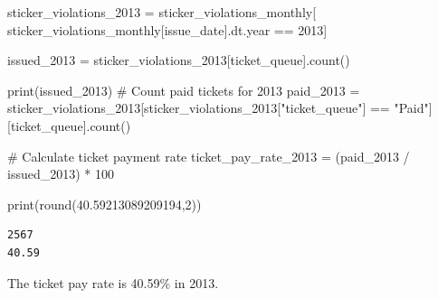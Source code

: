 \documentclass[
  letterpaper,
  DIV=11,
  numbers=noendperiod]{scrartcl}
\newenvironment{Shaded}{\begin{snugshade}}{\end{snugshade}}
\newcommand{\BuiltInTok}[1]{\textcolor[rgb]{0.00,0.23,0.31}{#1}}
\newcommand{\CommentTok}[1]{\textcolor[rgb]{0.37,0.37,0.37}{#1}}
\newcommand{\DecValTok}[1]{\textcolor[rgb]{0.68,0.00,0.00}{#1}}
\newcommand{\FloatTok}[1]{\textcolor[rgb]{0.68,0.00,0.00}{#1}}
\newcommand{\NormalTok}[1]{\textcolor[rgb]{0.00,0.23,0.31}{#1}}
\newcommand{\OperatorTok}[1]{\textcolor[rgb]{0.37,0.37,0.37}{#1}}
\newcommand{\StringTok}[1]{\textcolor[rgb]{0.13,0.47,0.30}{#1}}
\begin{document}
\begin{Shaded}
\begin{Highlighting}[]
\NormalTok{sticker\_violations\_2013 }\OperatorTok{=}\NormalTok{ sticker\_violations\_monthly[}
\NormalTok{    sticker\_violations\_monthly[}\StringTok{\textquotesingle{}issue\_date\textquotesingle{}}\NormalTok{].dt.year }\OperatorTok{==} \DecValTok{2013}\NormalTok{]}

\NormalTok{issued\_2013 }\OperatorTok{=}\NormalTok{ sticker\_violations\_2013[}\StringTok{\textquotesingle{}ticket\_queue\textquotesingle{}}\NormalTok{].count()}

\BuiltInTok{print}\NormalTok{(issued\_2013)}
\CommentTok{\# Count paid tickets for 2013}
\NormalTok{paid\_2013 }\OperatorTok{=}\NormalTok{ sticker\_violations\_2013[sticker\_violations\_2013[}\StringTok{"ticket\_queue"}\NormalTok{]}
                                    \OperatorTok{==} \StringTok{"Paid"}\NormalTok{][}\StringTok{\textquotesingle{}ticket\_queue\textquotesingle{}}\NormalTok{].count()}

\CommentTok{\# Calculate ticket payment rate}
\NormalTok{ticket\_pay\_rate\_2013 }\OperatorTok{=}\NormalTok{ (paid\_2013 }\OperatorTok{/}\NormalTok{ issued\_2013) }\OperatorTok{*} \DecValTok{100}


\BuiltInTok{print}\NormalTok{(}\BuiltInTok{round}\NormalTok{(}\FloatTok{40.59213089209194}\NormalTok{,}\DecValTok{2}\NormalTok{))}
\end{Highlighting}
\end{Shaded}

\begin{verbatim}
2567
40.59
\end{verbatim}

The ticket pay rate is 40.59\% in 2013.
\end{document}
